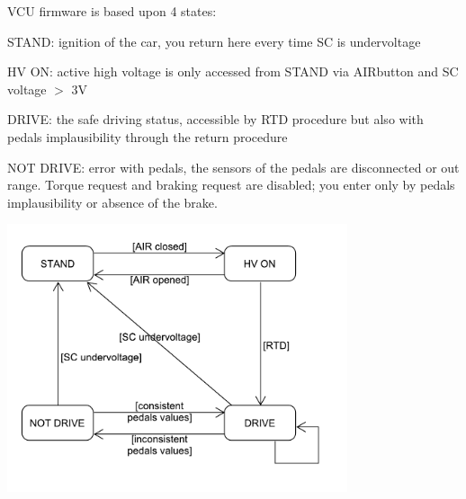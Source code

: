V\+CU firmware is based upon 4 states\+:
\begin{DoxyItemize}
\item \label{_f_s_m_page_STAND}%
%
S\+T\+A\+ND\+: ignition of the car, you return here every time SC is undervoltage
\item \label{_f_s_m_page_HVON}%
%
HV ON\+: active high voltage is only accessed from S\+T\+A\+ND via A\+I\+Rbutton and SC voltage $>$ 3V
\item \label{_f_s_m_page_DRIVE}%
%
D\+R\+I\+VE\+: the safe driving status, accessible by R\+TD procedure but also with pedals implausibility through the return procedure
\item \label{_f_s_m_page_NOTDRIVE}%
%
N\+OT D\+R\+I\+VE\+: error with pedals, the sensors of the pedals are disconnected or out range. Torque request and braking request are disabled; you enter only by pedals implausibility or absence of the brake.
\end{DoxyItemize}

 
\begin{DoxyImage}
\includegraphics[width=10cm]{fsm_diagram}
\end{DoxyImage}
 